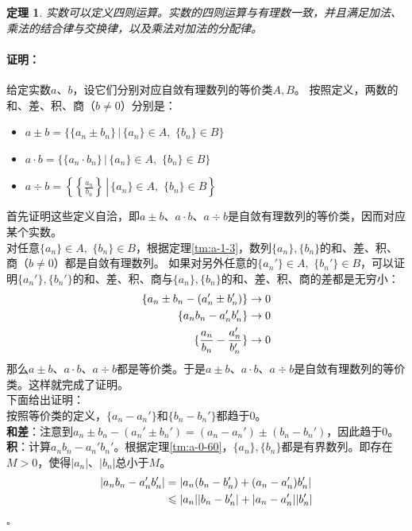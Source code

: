 \documentclass[12pt,UTF8]{ctexbook}
\newtheorem{tm}{定理}[section]
\renewenvironment{proof}{\paragraph{\textbf{证明：}}}{\hfill$\square$}
\begin{document}
\begin{appendix}
\begin{tm}\label{tm:a-1-20}
    实数可以定义四则运算。实数的四则运算与有理数一致，并且满足加法、乘法的结合律与交换律，以及乘法对加法的分配律。
\end{tm}
\begin{proof}
    给定实数$a$、$b$，设它们分别对应自敛有理数列的等价类$A,B$。
    按照定义，两数的和、差、积、商（$b\neq 0$）分别是：
    \begin{itemize}
        \item $a \pm b = \{\{a_n \pm b_n\} \, |\, \{a_n\}\in A,\,\,\{b_n\}\in B \}$
        \item $a\cdot b = \{\{a_n \cdot b_n\} \, |\, \{a_n\}\in A,\,\,\{b_n\}\in B \}$
        \item $a\div b = \left.\left\{\left\{\frac{a_n}{b_n}\right\} \, \right|\, \{a_n\}\in A,\,\,\{b_n\}\in B \right\}$
    \end{itemize}
    首先证明这些定义自洽，即$a\pm b$、$a\cdot b$、$a\div b$是自敛有理数列的等价类，因而对应某个实数。\\
    对任意$\{a_n\}\in A,\,\,\{b_n\}\in B$，根据定理\ref{tm:a-1-3}，数列$\{a_n\}, \{b_n\}$的和、差、积、商（$b\neq 0$）都是自敛有理数列。
    如果对另外任意的$\{a_n'\}\in A,\,\,\{b_n'\}\in B$，可以证明$\{a_n'\}, \{b_n'\}$的和、差、积、商与$\{a_n\}, \{b_n\}$的和、差、积、商的差都是无穷小：
    \begin{align}
        \{a_n \pm b_n - (a_n' \pm b_n')\} &\to 0 \notag \\
        \{a_nb_n - a_n'b_n'\} &\to 0 \notag \\
        \{\frac{a_n}{b_n} - \frac{a_n'}{b_n'}\} &\to 0 \notag 
    \end{align}
    那么$a\pm b$、$a\cdot b$、$a\div b$都是等价类。于是$a\pm b$、$a\cdot b$、$a\div b$是自敛有理数列的等价类。这样就完成了证明。\\
    下面给出证明：\\
    按照等价类的定义，$\{a_n - a_n'\}$和$\{b_n - b_n'\}$都趋于$0$。\\
    \textbf{和差}：注意到$a_n \pm b_n - (a_n' \pm b_n') = (a_n - a_n') \pm (b_n - b_n')$，因此趋于$0$。\\
    \textbf{积}：计算$a_nb_n - a_n'b_n'$。根据定理\ref{tm:a-0-60}，$\{a_n\}, \{b_n\}$都是有界数列。即存在$M>0$，使得$|a_n|$、$|b_n|$总小于$M$。
    \begin{align}
        |a_nb_n - a_n'b_n'| &= |a_n(b_n - b_n') + (a_n - a_n')b_n'| \notag \\
        &\leqslant |a_n||b_n - b_n'| + |a_n - a_n'||b_n'| \notag \\

\end{align}
\end{proof}
\end{appendix}
\end{document}
